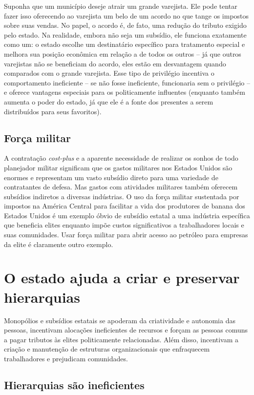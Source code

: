 Suponha que um município deseje atrair um grande varejista. Ele pode tentar fazer isso oferecendo ao varejista um belo de um acordo no que tange os impostos sobre suas vendas. No papel, o acordo é, de fato, uma redução do tributo exigido pelo estado. Na realidade, embora não seja um subsídio, ele funciona exatamente como um: o estado escolhe um destinatário específico para tratamento especial e melhora sua posição econômica em relação a de todos os outros -- já que outros varejistas não se beneficiam do acordo, eles estão em desvantagem quando comparados com o grande varejista. Esse tipo de privilégio incentiva o comportamento ineficiente -- se não fosse ineficiente, funcionaria sem o privilégio -- e oferece vantagens especiais para os politicamente influentes (enquanto também aumenta o poder do estado, já que ele é a fonte dos presentes a serem distribuídos para seus favoritos).

\subsection*{Força militar}

A contratação \emph{cost-plus} e a aparente necessidade de realizar os sonhos de todo planejador militar significam que os gastos militares nos Estados Unidos são enormes e representam um vasto subsídio direto para uma variedade de contratantes de defesa. Mas gastos com atividades militares também oferecem subsídios indiretos a diversas indústrias. O uso da força militar sustentada por impostos na América Central para facilitar a vida dos produtores de banana dos Estados Unidos é um exemplo óbvio de subsídio estatal a uma indústria específica que beneficia elites enquanto impõe custos significativos a trabalhadores locais e suas comunidades. Usar força militar para abrir acesso ao petróleo para empresas da elite é claramente outro exemplo.

\section{O estado ajuda a criar e preservar hierarquias}

Monopólios e subsídios estatais se apoderam da criatividade e autonomia das pessoas, incentivam alocações ineficientes de recursos e forçam as pessoas comuns a pagar tributos às elites politicamente relacionadas. Além disso, incentivam a criação e manutenção de estruturas organizacionais que enfraquecem trabalhadores e prejudicam comunidades.

\subsection*{Hierarquias são ineficientes}

